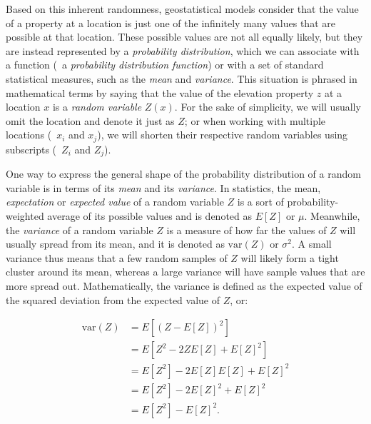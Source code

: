 Based on this inherent randomness, geostatistical models consider that the value of a property at a location is just one of the infinitely many values that are possible at that location.
These possible values are not all equally likely, but they are instead represented by a \emph{probability distribution}, which we can associate with a function (\ie\ a \emph{probability distribution function}) or with a set of standard statistical measures, such as the \emph{mean} and \emph{variance}.
This situation is phrased in mathematical terms by saying that the value of the elevation property \(z\) at a location \(x\) is a \emph{random variable} \(Z(x)\).
For the sake of simplicity, we will usually omit the location and denote it just as \(Z\); or when working with multiple locations (\eg\ \(x_i\) and \(x_j\)), we will shorten their respective random variables using subscripts (\eg\ \(Z_i\) and \(Z_j\)).


One way to express the general shape of the probability distribution of a random variable is in terms of its \emph{mean} and its \emph{variance}.
In statistics, the mean, \emph{expectation} or \emph{expected value} of a random variable \(Z\) is a sort of probability-weighted average of its possible values and is denoted as \(E[Z]\) or \(\mu\).
Meanwhile, the \emph{variance} of a random variable \(Z\) is a measure of how far the values of \(Z\) will usually spread from its mean, and it is denoted as \(\mathrm{var}(Z)\) or \(\sigma^2\).
A small variance thus means that a few random samples of \(Z\) will likely form a tight cluster around its mean, whereas a large variance will have sample values that are more spread out.
Mathematically, the variance is defined as the expected value of the squared deviation from the expected value of \(Z\), or:

\begin{align}
\mathrm{var}(Z) &= E\left[{\left(Z-E\left[Z\right]\right)}^2\right] \label{eq:variance1} \\
&= E\left[Z^2 -2ZE\left[Z\right] + E[Z]^2\right] \nonumber \\
&= E\left[Z^2\right] - 2E\left[Z\right]E\left[Z\right] + E\left[Z\right]^2 \nonumber \\
&= E\left[Z^2\right] - 2E\left[Z\right]^2 + E\left[Z\right]^2 \nonumber \\
&= E\left[Z^2\right]-{E[Z]}^2. \label{eq:variance2}
\end{align}

